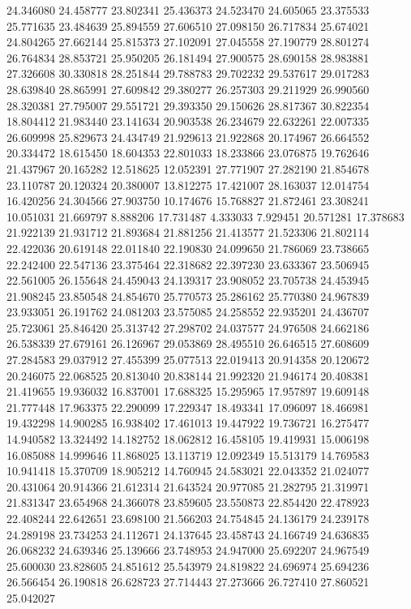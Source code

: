24.346080
24.458777
23.802341
25.436373
24.523470
24.605065
23.375533
25.771635
23.484639
25.894559
27.606510
27.098150
26.717834
25.674021
24.804265
27.662144
25.815373
27.102091
27.045558
27.190779
28.801274
26.764834
28.853721
25.950205
26.181494
27.900575
28.690158
28.983881
27.326608
30.330818
28.251844
29.788783
29.702232
29.537617
29.017283
28.639840
28.865991
27.609842
29.380277
26.257303
29.211929
26.990560
28.320381
27.795007
29.551721
29.393350
29.150626
28.817367
30.822354
18.804412
21.983440
23.141634
20.903538
26.234679
22.632261
22.007335
26.609998
25.829673
24.434749
21.929613
21.922868
20.174967
26.664552
20.334472
18.615450
18.604353
22.801033
18.233866
23.076875
19.762646
21.437967
20.165282
12.518625
12.052391
27.771907
27.282190
21.854678
23.110787
20.120324
20.380007
13.812275
17.421007
28.163037
12.014754
16.420256
24.304566
27.903750
10.174676
15.768827
21.872461
23.308241
10.051031
21.669797
8.888206
17.731487
4.333033
7.929451
20.571281
17.378683
21.922139
21.931712
21.893684
21.881256
21.413577
21.523306
21.802114
22.422036
20.619148
22.011840
22.190830
24.099650
21.786069
23.738665
22.242400
22.547136
23.375464
22.318682
22.397230
23.633367
23.506945
22.561005
26.155648
24.459043
24.139317
23.908052
23.705738
24.453945
21.908245
23.850548
24.854670
25.770573
25.286162
25.770380
24.967839
23.933051
26.191762
24.081203
23.575085
24.258552
22.935201
24.436707
25.723061
25.846420
25.313742
27.298702
24.037577
24.976508
24.662186
26.538339
27.679161
26.126967
29.053869
28.495510
26.646515
27.608609
27.284583
29.037912
27.455399
25.077513
22.019413
20.914358
20.120672
20.246075
22.068525
20.813040
20.838144
21.992320
21.946174
20.408381
21.419655
19.936032
16.837001
17.688325
15.295965
17.957897
19.609148
21.777448
17.963375
22.290099
17.229347
18.493341
17.096097
18.466981
19.432298
14.900285
16.938402
17.461013
19.447922
19.736721
16.275477
14.940582
13.324492
14.182752
18.062812
16.458105
19.419931
15.006198
16.085088
14.999646
11.868025
13.113719
12.092349
15.513179
14.769583
10.941418
15.370709
18.905212
14.760945
24.583021
22.043352
21.024077
20.431064
20.914366
21.612314
21.643524
20.977085
21.282795
21.319971
21.831347
23.654968
24.366078
23.859605
23.550873
22.854420
22.478923
22.408244
22.642651
23.698100
21.566203
24.754845
24.136179
24.239178
24.289198
23.734253
24.112671
24.137645
23.458743
24.166749
24.636835
26.068232
24.639346
25.139666
23.748953
24.947000
25.692207
24.967549
25.600030
23.828605
24.851612
25.543979
24.819822
24.696974
25.694236
26.566454
26.190818
26.628723
27.714443
27.273666
26.727410
27.860521
25.042027
